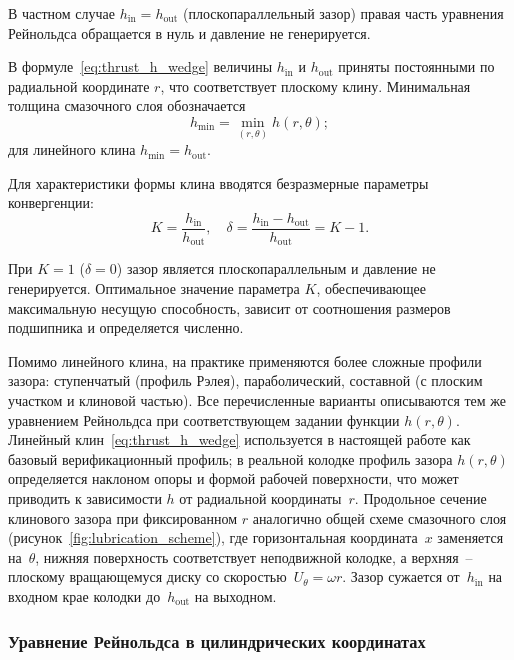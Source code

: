 В частном случае $h_{\mathrm{in}} = h_{\mathrm{out}}$ (плоскопараллельный зазор) правая часть уравнения Рейнольдса обращается в нуль и давление не генерируется.

В формуле~\eqref{eq:thrust_h_wedge} величины $h_{\mathrm{in}}$ и $h_{\mathrm{out}}$ приняты постоянными по радиальной координате $r$, что соответствует плоскому клину. Минимальная толщина смазочного слоя обозначается
\begin{equation}
h_{\min} = \min_{(r,\theta)} h(r,\theta);
\label{eq:thrust_h_min}
\end{equation}
для линейного клина $h_{\min} = h_{\mathrm{out}}$.

Для характеристики формы клина вводятся безразмерные параметры конвергенции:
\begin{equation}
K = \frac{h_{\mathrm{in}}}{h_{\mathrm{out}}}, \quad \delta = \frac{h_{\mathrm{in}} - h_{\mathrm{out}}}{h_{\mathrm{out}}} = K - 1.
\label{eq:thrust_convergence}
\end{equation}

При $K = 1$ ($\delta = 0$) зазор является плоскопараллельным и давление не генерируется. Оптимальное значение параметра $K$, обеспечивающее максимальную несущую способность, зависит от соотношения размеров подшипника и определяется численно.

Помимо линейного клина, на практике применяются более сложные профили зазора: ступенчатый (профиль Рэлея), параболический, составной (с плоским участком и клиновой частью). Все перечисленные варианты описываются тем же уравнением Рейнольдса при соответствующем задании функции $h(r,\theta)$. Линейный клин~\eqref{eq:thrust_h_wedge} используется в настоящей работе как базовый верификационный профиль; в реальной колодке профиль зазора $h(r,\theta)$ определяется наклоном опоры и формой рабочей поверхности, что может приводить к зависимости $h$ от радиальной координаты~$r$. Продольное сечение клинового зазора при фиксированном $r$ аналогично общей схеме смазочного слоя (рисунок~\ref{fig:lubrication_scheme}), где горизонтальная координата~$x$ заменяется на~$\theta$, нижняя поверхность соответствует неподвижной колодке, а верхняя~-- плоскому вращающемуся диску со скоростью~$U_\theta = \omega r$. Зазор сужается от~$h_{\mathrm{in}}$ на входном крае колодки до~$h_{\mathrm{out}}$ на выходном.



\subsubsection*{Уравнение Рейнольдса в цилиндрических координатах}

